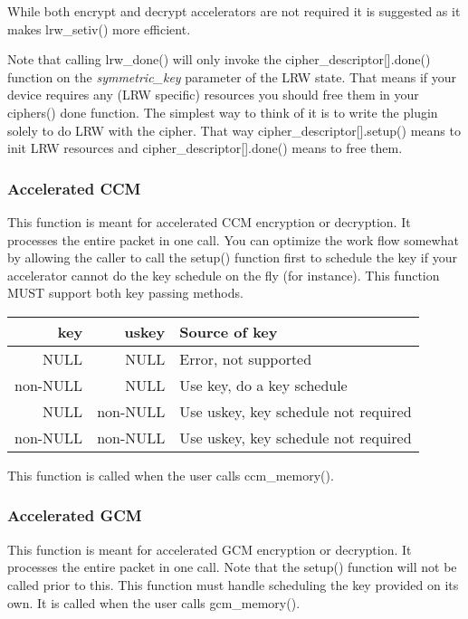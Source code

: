 \documentclass[synpaper]{book}
\begin{document}
While both encrypt and decrypt accelerators are not required it is suggested as it makes lrw\_setiv() more efficient.

Note that calling lrw\_done() will only invoke the cipher\_descriptor[].done() function on the \textit{symmetric\_key} parameter of the LRW state.  That means
if your device requires any (LRW specific) resources you should free them in your ciphers() done function.  The simplest way to think of it is to write
the plugin solely to do LRW with the cipher.  That way cipher\_descriptor[].setup() means to init LRW resources and cipher\_descriptor[].done() means to
free them.

\subsubsection{Accelerated CCM}
This function is meant for accelerated CCM encryption or decryption.  It processes the entire packet in one call.  You can optimize the work flow somewhat
by allowing the caller to call the setup() function first to schedule the key if your accelerator cannot do the key schedule on the fly (for instance).  This
function MUST support both key passing methods.

\begin{center}
\begin{small}
\begin{tabular}{|r|r|l|}
\hline \textbf{key} & \textbf{uskey} & \textbf{Source of key} \\
\hline NULL         & NULL           & Error, not supported \\
\hline non-NULL     & NULL           & Use key, do a key schedule \\
\hline NULL         & non-NULL       & Use uskey, key schedule not required \\
\hline non-NULL     & non-NULL       & Use uskey, key schedule not required \\
\hline
\end{tabular}
\end{small}
\end{center}

 This function is called when the user calls ccm\_memory().

\subsubsection{Accelerated GCM}
This function is meant for accelerated GCM encryption or decryption.  It processes the entire packet in one call.  Note that the setup() function will not
be called prior to this.  This function must handle scheduling the key provided on its own.  It is called when the user calls gcm\_memory().
\end{document}
